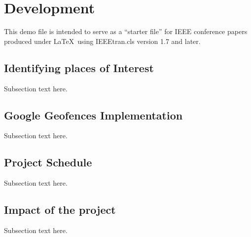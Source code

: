 \section{Development}
This demo file is intended to serve as a ``starter file''
for IEEE conference papers produced under \LaTeX\ using
IEEEtran.cls version 1.7 and later.

\subsection{Identifying places of Interest}
Subsection text here.

\subsection{Google Geofences Implementation}
Subsection text here.

\subsection{Project Schedule}
Subsection text here.

\subsection{Impact of the project}
Subsection text here.



